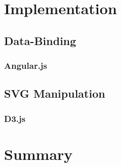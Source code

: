 \section{Implementation}
\subsection{Data-Binding}
\subsubsection{Angular.js}
\subsection{SVG Manipulation}
\subsubsection{D3.js}

\section{Summary}
